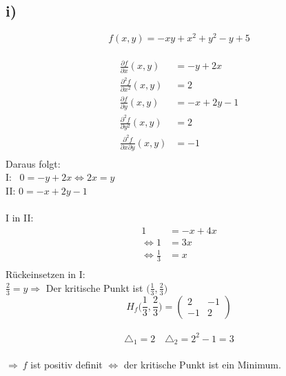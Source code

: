 \documentclass[a4paper]{scrartcl}
\begin{document}
\subsection{i)}
\[f(x,y)=-xy+x^2+y^2-y+5\] \\
\begin{align}
\frac{\partial f}{\partial x}(x,y) &= -y + 2x \\
\frac{\partial ^2 f}{\partial x^2}(x,y) &= 2 \\
\frac{\partial f}{\partial y}(x,y) &= -x + 2y -1 \\
\frac{\partial ^2 f}{\partial y^2}(x,y)  &= 2 \\
\frac{\partial ^2 f}{\partial x \partial y}(x,y) &= -1 \\ 
\end{align}
Daraus folgt: \\
I: \ \(0 = -y + 2x \Leftrightarrow 2x = y\) \\
II: \(0 = -x +2y -1 \) \\
\\
I in II:\\ 
\begin{align}
1 &= -x +4x \\
\Leftrightarrow 1 &= 3x \\
\Leftrightarrow \frac{1}{3} &= x \\
\end{align}
Rückeinsetzen in I: \\
\(\frac{2}{3} = y \Rightarrow\) Der kritische Punkt ist \(\Big(\frac{1}{3},\frac{2}{3}\Big)\) \\
\[H_f\Big(\frac{1}{3},\frac{2}{3}\Big) = \begin{pmatrix}
 2 & -1 \\
-1 &  2 
\end{pmatrix}\] \\
\[\triangle_1 = 2\quad \triangle_2 = 2^2-1 = 3\] \\
\(\Rightarrow\ f\) ist positiv definit \(\Leftrightarrow\) der kritische Punkt ist ein Minimum. \\
\end{document}
